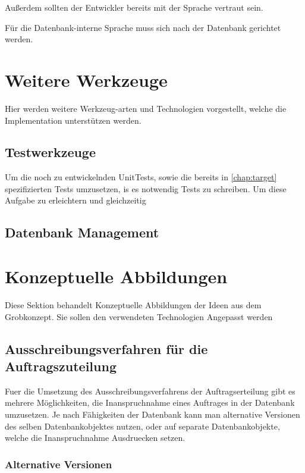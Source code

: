 Außerdem sollten der Entwickler bereits mit der Sprache vertraut sein.

Für die Datenbank-interne Sprache muss sich nach der Datenbank gerichtet werden.


\section{Weitere Werkzeuge}

Hier werden weitere Werkzeug-arten und Technologien vorgestellt,
welche die Implementation unterstützen werden.

\subsection{Testwerkzeuge}

Um die noch zu entwickelnden UnitTests,
sowie die bereits in \cref{chap:target} spezifizierten Tests umzusetzen,
is es notwendig Tests zu schreiben. Um diese Aufgabe zu erleichtern
und gleichzeitig 

\subsection{Datenbank Management}




\section{Konzeptuelle Abbildungen}

Diese Sektion behandelt Konzeptuelle Abbildungen der Ideen aus dem Grobkonzept.
Sie sollen den verwendeten Technologien Angepasst werden

\subsection{Ausschreibungsverfahren für die Auftragszuteilung}

Fuer die Umsetzung des Ausschreibungsverfahrens der Auftragserteilung gibt es
mehrere Möglichkeiten, die Inanspruchnahme eines Auftrages in
der Datenbank umzusetzen. Je nach Fähigkeiten der Datenbank kann man 
alternative Versionen des selben Datenbankobjektes nutzen,
oder auf separate Datenbankobjekte, welche die Inanspruchnahme Ausdruecken setzen.

\subsubsection{Alternative Versionen}

